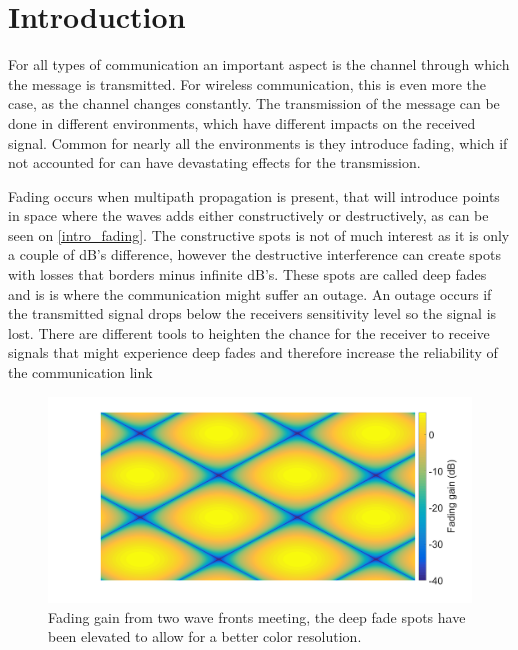 \chapter{Introduction}
\label{chap:introduction}
%





For all types of communication an important aspect is the channel through which the message is transmitted. For wireless communication, this is even more the case, as the channel changes constantly. The transmission of the message can be done in different environments, which have different impacts on the received signal. Common for nearly all the environments is they introduce fading, which if not accounted for can have devastating effects for the transmission. 

Fading occurs when multipath propagation is present, that will introduce points in space where the waves adds either constructively or destructively, as can be seen on \autoref{intro_fading}. The constructive spots is not of much interest as it is only a couple of dB's difference, however the destructive interference can create spots with losses that borders minus infinite dB's. These spots are called deep fades and is is where the communication might suffer an outage. An outage occurs if the transmitted signal drops below the receivers sensitivity level so the signal is lost. There are different tools to heighten the chance for the receiver to receive signals that might experience deep fades and therefore increase the reliability of the communication link


\begin{figure}[H]
\centering
\includegraphics[width=\textwidth]{figures/intro_fading.png}
\caption{Fading gain from two wave fronts meeting, the deep fade spots have been elevated to allow for a better color resolution.}
\label{intro_fading}
\end{figure}

